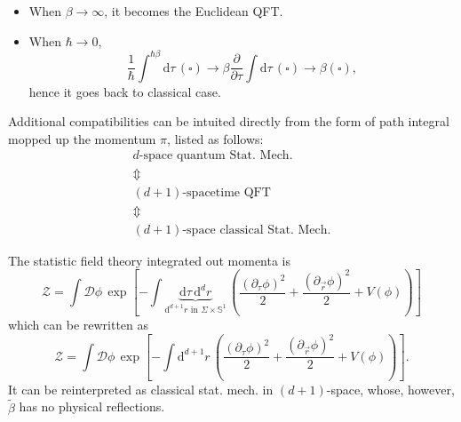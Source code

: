 \begin{itemize}
  \item When $\beta \to \infty$, it becomes the Euclidean QFT.
  \item When $\hbar \to  0$,
  \begin{equation}
    \frac{1}{\hbar} \int^{\hbar \beta} \mathrm{d} \tau \, \left( \square \right) \to \beta \frac{\partial }{\partial \tau} \int \mathrm{d} \tau \, \left( \square \right)  \to  \beta \left( \square \right) ,
  \end{equation}
  hence it goes back to classical case.
\end{itemize}

Additional compatibilities can be intuited directly from the form of path integral mopped up the momentum $\pi$, listed as follows:
\begin{equation*}
  \begin{matrix}
      d\text{-space quantum Stat. Mech.}\\
      \Updownarrow \\
      (d+1) \text{-spacetime QFT}\\
      \Updownarrow \\
      (d+1) \text{-space classical Stat. Mech.}
  \end{matrix}
\end{equation*}

The statistic field theory integrated out momenta is
\begin{equation}
  \mathcal{Z} = \int \mathcal{D} \phi  \, \exp\left[ - \int \underbrace{\mathrm{d} \tau \, \mathrm{d} ^{d} r}_{\mathrm{d} ^{d+1} r \text{ in } \Sigma \times \mathbb{S}^{1}}\, \left( \frac{\left( \partial_{\tau} \phi \right) ^{2}}{2} + \frac{\left( \partial_{\vec{r}} \phi \right) ^{2}}{2} + V\left( \phi \right)  \right) \right] 
\end{equation} 
which can be rewritten as
\begin{equation}
  \mathcal{Z} = \int \mathcal{D} \phi \, \exp \left[ - \int \mathrm{d} ^{d+1} r \, \left( \frac{\left( \partial_{\tau} \phi \right) ^{2}}{2} + \frac{\left( \partial_{\vec{r}} \phi \right) ^{2}}{2} + V\left( \phi \right)  \right)  \right] .
\end{equation}
It can be reinterpreted as classical stat. mech. in $(d+1)$-space, whose, however, $\tilde{\beta}$ has no physical reflections.

